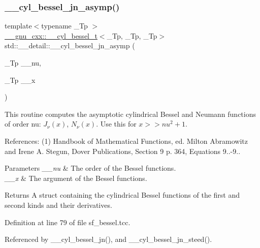 \subsubsection{\texorpdfstring{\+\_\+\+\_\+cyl\+\_\+bessel\+\_\+jn\+\_\+asymp()}{\_\_cyl\_bessel\_jn\_asymp()}}
{\footnotesize\ttfamily template$<$typename \+\_\+\+Tp $>$ \\
\hyperlink{struct____gnu__cxx_1_1____cyl__bessel__t}{\+\_\+\+\_\+gnu\+\_\+cxx\+::\+\_\+\+\_\+cyl\+\_\+bessel\+\_\+t}$<$\+\_\+\+Tp, \+\_\+\+Tp, \+\_\+\+Tp$>$ std\+::\+\_\+\+\_\+detail\+::\+\_\+\+\_\+cyl\+\_\+bessel\+\_\+jn\+\_\+asymp (\begin{DoxyParamCaption}\item[{\+\_\+\+Tp}]{\+\_\+\+\_\+nu,  }\item[{\+\_\+\+Tp}]{\+\_\+\+\_\+x }\end{DoxyParamCaption})}



This routine computes the asymptotic cylindrical Bessel and Neumann functions of order nu\+: $ J_{\nu}(x) $, $ N_{\nu}(x) $. Use this for $ x >> nu^2 + 1 $. 

References\+: (1) Handbook of Mathematical Functions, ed. Milton Abramowitz and Irene A. Stegun, Dover Publications, Section 9 p. 364, Equations 9..-\/9..


\begin{DoxyParams}{Parameters}
{\em \+\_\+\+\_\+nu} & The order of the Bessel functions. \\
\hline
{\em \+\_\+\+\_\+x} & The argument of the Bessel functions. \\
\hline
\end{DoxyParams}
\begin{DoxyReturn}{Returns}
A struct containing the cylindrical Bessel functions of the first and second kinds and their derivatives. 
\end{DoxyReturn}


Definition at line 79 of file sf\+\_\+bessel.\+tcc.



Referenced by \+\_\+\+\_\+cyl\+\_\+bessel\+\_\+jn(), and \+\_\+\+\_\+cyl\+\_\+bessel\+\_\+jn\+\_\+steed().

\mbox{\label{namespacestd_1_1____detail_a82d890270a5a8697d4af64c390b4b0e4}} 
